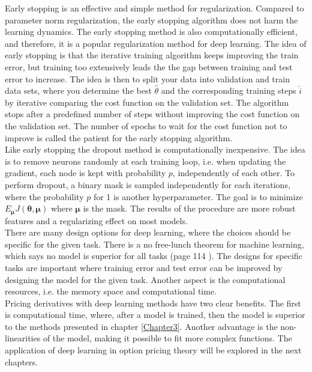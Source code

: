 Early stopping is an effective and simple method for regularization. Compared to parameter norm regularization, the early stopping algorithm does not harm the learning dynamics. The early stopping method is also computationally efficient, and therefore, it is a popular regularization method for deep learning. The idea of early stopping is that the iterative training algorithm keeps improving the train error, but training too extensively leads the the gap between training and test error to increase. The idea is then to split your data into validation and train data sets, where you determine the best $\hat{\theta}$ and the corresponding training steps $\hat{i}$ by iterative comparing the cost function on the validation set. The algorithm stops after a predefined number of steps without improving the cost function on the validation set. The number of epochs to wait for the cost function not to improve is called the patient for the early stopping algorithm.\\

Like early stopping the dropout method is computationally inexpensive. The idea is to remove neurons randomly at each training loop, i.e. when updating the gradient, each node is kept with probability $p$, independently of each other. To perform dropout, a binary mask is sampled independently for each iterations, where the probability $p$ for 1 is another hyperparameter. The goal is to minimize $E_{\bm{\mu}} J(\bm{\theta}, \bm{\mu})$ where $\bm{\mu}$ is the mask. The results of the procedure are more robust features and a regularizing effect on most models.\\

There are many design options for deep learning, where the choices should be specific for the given task. There is a no free-lunch theorem for machine learning, which says no model is superior for all tasks (page 114 \parencite{Goodfellow-et-al-2016}). The designs for specific tasks are important where training error and test error can be improved by designing the model for the given task. Another aspect is the computational resources, i.e. the memory space and computational time. \\

Pricing derivatives with deep learning methods have two clear benefits. The first is computational time, where, after a model is trained, then the model is superior to the methods presented in chapter \ref{Chapter3}. Another advantage is the non-linearities of the model, making it possible to fit more complex functions. The application of deep learning in option pricing theory will be explored in the next chapters.
